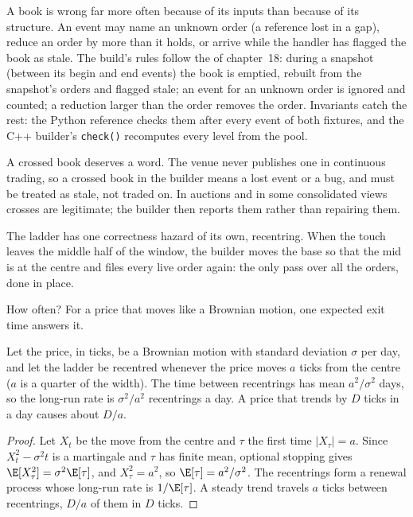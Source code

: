 A book is wrong far more often because of its inputs than because of its structure. An event may name an unknown order (a
reference lost in a gap), reduce an order by more than it holds, or arrive while the handler has flagged the book as stale.
The build's rules follow the  of chapter~18: during a snapshot (between its begin and end events) the book is
emptied, rebuilt from the snapshot's orders and flagged stale; an event for an unknown order is ignored and counted; a
reduction larger than the order removes the order. Invariants catch the rest: the Python reference checks them after every
event of both fixtures, and the C++ builder's \texttt{check()} recomputes every level from the pool.

A crossed book deserves a word. The venue never publishes one in continuous trading, so a crossed book in the builder means
a lost event or a bug, and must be treated as stale, not traded on. In auctions and in some consolidated views crosses are
legitimate; the builder then reports them rather than repairing them.

The ladder has one correctness hazard of its own, recentring. When the touch leaves the middle half of the window, the builder
moves the base so that the mid is at the centre and files every live order again: the only pass over all the orders, done in
place.

\label{lst:ll:the-order-book-builder:recentre}

How often? For a price that moves like a Brownian motion, one expected exit time answers it.

\begin{proposition}\label{prop:ll:the-order-book-builder:recentre}
Let the price, in ticks, be a Brownian motion with standard deviation $\sigma$ per day, and let the ladder be recentred
whenever the price moves $a$ ticks from the centre ($a$ is a quarter of the width). The time between recentrings has mean
$a^2/\sigma^2$ days, so the long-run rate is $\sigma^2/a^2$ recentrings a day. A price that trends by $D$ ticks in a day causes
about $D/a$.
\end{proposition}

\begin{proof}
Let $X_t$ be the move from the centre and $\tau$ the first time $|X_\tau| = a$. Since $X_t^2 - \sigma^2 t$ is a martingale and
$\tau$ has finite mean, optional stopping gives $\E[X_\tau^2] = \sigma^2 \E[\tau]$, and $X_\tau^2 = a^2$, so $\E[\tau] =
a^2/\sigma^2$. The recentrings form a renewal process whose long-run rate is $1/\E[\tau]$. A steady trend travels $a$ ticks
between recentrings, $D/a$ of them in $D$ ticks.
\end{proof}

